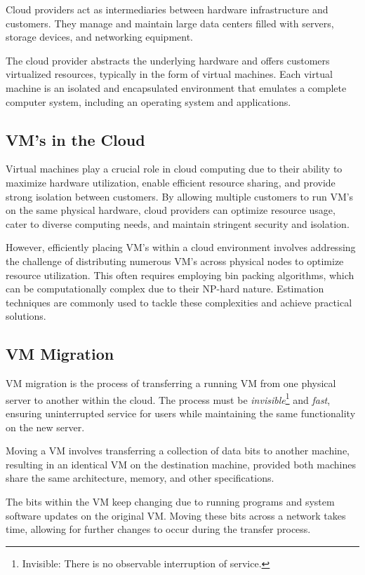 \documentclass{report}
\newcommand{\abstractionBegin}[1]{\begin{tcolorbox}[colback=violet!5!white,colframe=violet,title={Abstraction:
      #1}]}
\newcommand{\abstractionEnd}{\end{tcolorbox}}
\newcommand{\asideBegin}[1]{\begin{tcolorbox}[colback=orange!5!white,colframe=black!75!orange,title={Aside:
      #1}]}
\newcommand{\asideEnd}{\end{tcolorbox}}
\begin{document}
Cloud providers act as intermediaries between hardware infrastructure and customers. They manage and
maintain large data centers filled with servers, storage devices, and networking equipment.

\abstractionBegin{The Cloud}
The cloud provider abstracts the underlying hardware and offers customers virtualized resources,
typically in the form of virtual machines. Each virtual machine is an isolated and encapsulated
environment that emulates a complete computer system, including an operating system and
applications.
\abstractionEnd


\subsection{VM's in the Cloud}
Virtual machines play a crucial role in cloud computing due to their ability to maximize hardware
utilization, enable efficient resource sharing, and provide strong isolation between customers. By
allowing multiple customers to run VM's on the same physical hardware, cloud providers can optimize
resource usage, cater to diverse computing needs, and maintain stringent security and isolation. 

However, efficiently placing VM's within a cloud environment involves addressing the
challenge of distributing numerous VM's across physical nodes to optimize resource utilization. This
often requires employing bin packing algorithms, which can be computationally complex due to their
NP-hard nature. Estimation techniques are commonly used to tackle these complexities and achieve
practical solutions. 


\subsection{VM Migration}
VM migration is the process of transferring a running VM from one physical server to another within
the cloud. The process must be \textit{invisible}\footnote{Invisible: There is no observable
interruption of service.} and \textit{fast}, ensuring uninterrupted service for users while
maintaining the same functionality on the new server.

Moving a VM involves transferring a collection of data bits to another machine, resulting in an
identical VM on the destination machine, provided both machines share the same architecture, memory,
and other specifications.

\asideBegin{The Issue}
The bits within the VM keep changing due to running programs and system software updates on the
original VM. Moving these bits across a network takes time, allowing for further changes to occur
during the transfer process.
\asideEnd
\end{document}
